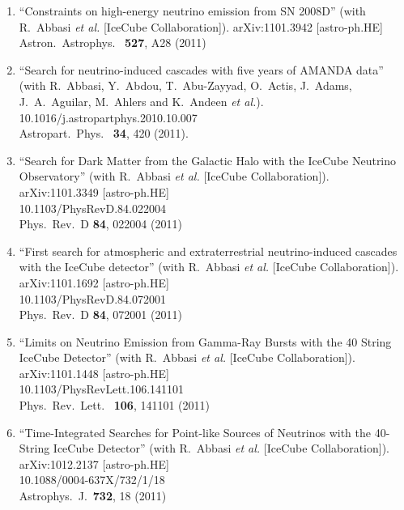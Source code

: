 \begin{enumerate}
\item ``Constraints on high-energy neutrino emission from SN 2008D'' (with R.~Abbasi {\it et al.}  [IceCube Collaboration]). arXiv:1101.3942 [astro-ph.HE] \\{}Astron.\ Astrophys.\ {\bf
    527}, A28 (2011) %


\item ``Search for neutrino-induced cascades with five years of AMANDA
  data'' (with R.~Abbasi, Y.~Abdou, T.~Abu-Zayyad, O.~Actis, J.~Adams,
  J.~A.~Aguilar, M.~Ahlers and K.~Andeen {\it et al.}). 10.1016/j.astropartphys.2010.10.007 \\{}Astropart.\ Phys.\ {\bf
    34}, 420 (2011). %


\item ``Search for Dark Matter from the Galactic Halo with the IceCube
  Neutrino Observatory'' (with R.~Abbasi {\it et al.}  [IceCube
    Collaboration]).  \\{}arXiv:1101.3349 [astro-ph.HE]
  \\{}10.1103/PhysRevD.84.022004 \\{}Phys.\ Rev.\ D {\bf 84}, 022004
  (2011) %


\item ``First search for atmospheric and extraterrestrial neutrino-induced
  cascades with the IceCube detector'' (with R.~Abbasi {\it et al.}
  [IceCube Collaboration]).  \\{}arXiv:1101.1692 [astro-ph.HE]
  \\{}10.1103/PhysRevD.84.072001 \\{}Phys.\ Rev.\ D {\bf 84}, 072001
  (2011) %


\item ``Limits on Neutrino Emission from Gamma-Ray Bursts with the 40 String
  IceCube Detector'' (with R.~Abbasi {\it et al.}  [IceCube
    Collaboration]).  \\{}arXiv:1101.1448 [astro-ph.HE]
  \\{}10.1103/PhysRevLett.106.141101 \\{}Phys.\ Rev.\ Lett.\ {\bf
    106}, 141101 (2011) %


\item ``Time-Integrated Searches for Point-like Sources of Neutrinos with
  the 40-String IceCube Detector'' (with R.~Abbasi {\it et al.}
  [IceCube Collaboration]).  \\{}arXiv:1012.2137 [astro-ph.HE]
  \\{}10.1088/0004-637X/732/1/18 \\{}Astrophys.\ J.\ {\bf 732}, 18
  (2011) %



\end{enumerate}
